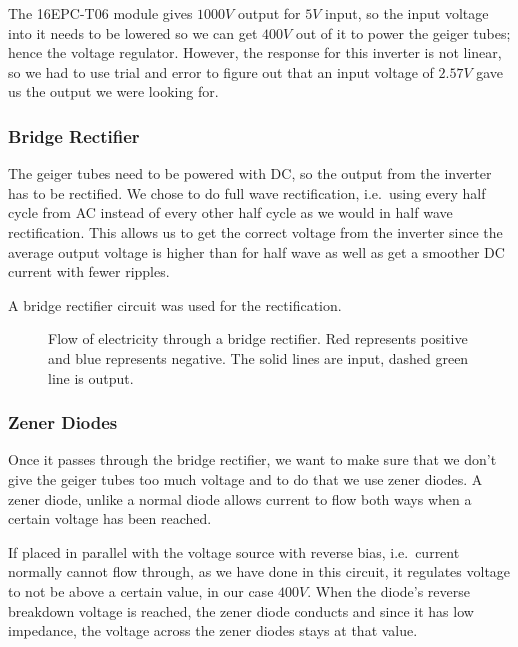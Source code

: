 \documentclass[oneside]{article}
\begin{document}
      The 16EPC-T06 module gives $1000V$ output for $5V$ input, so the input voltage into it needs to be lowered so we can get $400V$ out of it to power the geiger tubes; hence the voltage regulator. However, the response for this inverter is not linear, so we had to use trial and error to figure out that an input voltage of $2.57V$ gave us the output we were looking for.

    \subsubsection{Bridge Rectifier}
      The geiger tubes need to be powered with DC, so the output from the inverter has to be rectified. We chose to do full wave rectification, i.e.\ using every half cycle from AC instead of every other half cycle as we would in half wave rectification. This allows us to get the correct voltage from the inverter since the average output voltage is higher than for half wave as well as get a smoother DC current with fewer ripples.

      A bridge rectifier circuit was used for the rectification.

      \begin{figure}[H]
          \centering
          \def\svgwidth{100mm}
          
          \caption{Flow of electricity through a bridge rectifier. Red represents positive and blue represents negative. The solid lines are input, dashed green line is output.}
          \label{bridgeRectifier}
      \end{figure}

      \subsubsection{Zener Diodes}
        Once it passes through the bridge rectifier, we want to make sure that we don't give the geiger tubes too much voltage and to do that we use zener diodes. A zener diode, unlike a normal diode allows current to flow both ways when a certain voltage has been reached.

        If placed in parallel with the voltage source with reverse bias, i.e.\ current normally cannot flow through, as we have done in this circuit, it regulates voltage to not be above a certain value, in our case $400V$. When the diode's reverse breakdown voltage is reached, the zener diode conducts and since it has low impedance, the voltage across the zener diodes stays at that value.
\end{document}
